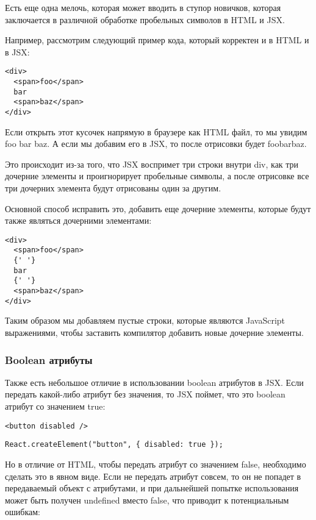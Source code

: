\documentclass[12pt]{book}
\begin{document}
Есть еще одна мелочь, которая может вводить в ступор новичков, которая заключается в различной обработке пробельных символов в HTML и JSX.

Например, рассмотрим следующий пример кода, который корректен и в HTML и в JSX:

\begin{lstlisting}
<div>
  <span>foo</span>
  bar
  <span>baz</span>
</div>
\end{lstlisting}

Если открыть этот кусочек напрямую в браузере как HTML файл, то мы увидим foo bar baz. А если мы добавим его в JSX, то после отрисовки будет foobarbaz.

Это происходит из-за того, что JSX воспримет три строки внутри div, как три дочерние элементы и проигнорирует пробельные символы, а после отрисовке все три дочерних элемента будут отрисованы один за другим.

Основной способ исправить это, добавить еще дочерние элементы, которые будут также являться дочерними элементами:

\begin{lstlisting}
<div>
  <span>foo</span>
  {' '}
  bar
  {' '}
  <span>baz</span>
</div>
\end{lstlisting}

Таким образом мы добавляем пустые строки, которые являются JavaScript выражениями, чтобы заставить компилятор добавить новые дочерние элементы.

\subsubsection*{Boolean атрибуты}

Также есть небольшое отличие в использовании boolean атрибутов в JSX. Если передать какой-либо атрибут без значения, то JSX поймет, что это boolean атрибут со значением true:

\begin{lstlisting}
<button disabled />
\end{lstlisting}

\begin{lstlisting}
React.createElement("button", { disabled: true });
\end{lstlisting}
   
Но в отличие от HTML, чтобы передать атрибут со значением false, необходимо сделать это в явном виде. Если не передать атрибут совсем, то он не попадет в передаваемый объект с атрибутами, и при дальнейшей попытке использования может быть получен undefined вместо false, что приводит к потенциальным ошибкам:
\end{document}

